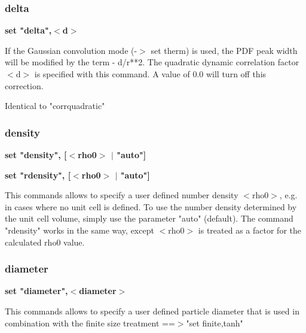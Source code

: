 \subsubsection{delta}
{\bf set "delta",$ <$d$> $ \par }
\par
\vspace{3pt}
If the Gaussian convolution mode (-$> $ set therm) is used, the PDF 
peak width will be modified by the term - d/r**2. The quadratic 
dynamic correlation factor $ <$d$> $ is specified with this command. A 
value of 0.0 will turn off this correction. 
\par
Identical to "corrquadratic" 
\subsubsection{density}
{\bf set "density", [$ <$rho0$> $ $| $ "auto"] \par }
{\bf set "rdensity", [$ <$rho0$> $ $| $ "auto"] \par }
\par
\vspace{3pt}
This commands allows to specify a user defined number density 
$ <$rho0$> $, e.g. in cases where no unit cell is defined. To use the 
number density determined by the unit cell volume, simply use 
the parameter "auto" (default). The command "rdensity" works in the 
same way, except $ <$rho0$> $ is treated as a factor for the calculated 
rho0 value. 
\subsubsection{diameter}
{\bf set "diameter",$ <$diameter$> $ \par }
\par
\vspace{3pt}
This commands allows to specify a user defined particle 
diameter that is used in combination with the finite size 
treatment ==$> $"set finite,tanh" 
